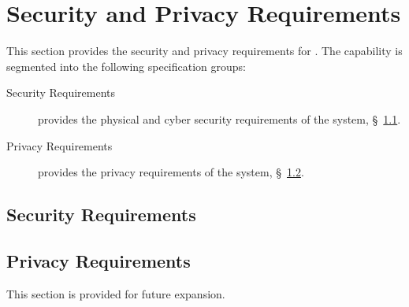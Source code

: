 \KNEADSECTIONNEWPAGE
\section{Security and Privacy Requirements}
\label{lab:sec_SecurityPrivacy}


This section provides the security and privacy requirements for \ThisSys. 
The \ThisSys capability is segmented into the following specification groups:

\begin{description}
	\item [Security Requirements] provides the physical and cyber security requirements of the system, \S~\ref{lab:ssec_Security}.
	\item [Privacy Requirements] provides the privacy requirements of the system, \S~\ref{lab:ssec_Privacy}.
\end{description}

\KNEADSUBSECTIONNEWPAGE
\subsection{Security Requirements}
\label{lab:ssec_Security}




\KNEADSUBSECTIONNEWPAGE
\subsection{Privacy Requirements}
\label{lab:ssec_Privacy}

This section is provided for future expansion.

